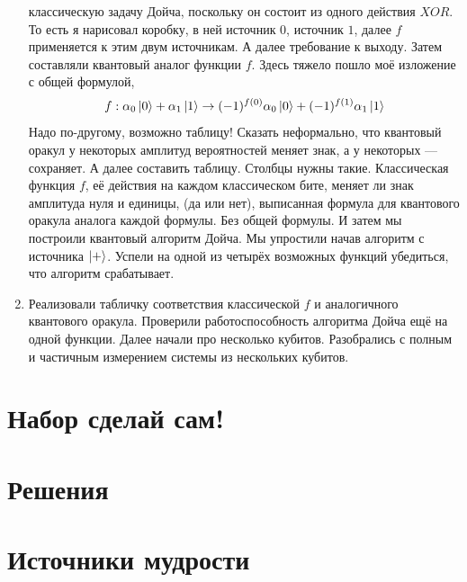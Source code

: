 \documentclass[12pt]{article}
\newcounter{problem}[section]
\theoremstyle{definition}
\begin{document}
\begin{enumerate}
  классическую задачу Дойча, поскольку он состоит из одного действия $XOR$. То есть
  я нарисовал коробку, в ней источник $0$, источник $1$, далее $f$ применяется к
  этим двум источникам. А далее требование к выходу. Затем составляли квантовый
  аналог функции $f$. Здесь тяжело пошло моё изложение с общей формулой,
  \[
   f : \alpha_0 \ket{0} + \alpha_1 \ket{1} \to
   (-1)^{f(0)}\alpha_0 \ket{0} + (-1)^{f(1)}\alpha_1 \ket{1}
  \]
  Надо по-другому, возможно таблицу! Сказать неформально, что квантовый оракул
  у некоторых амплитуд вероятностей меняет знак, а у некоторых — сохраняет.
  А далее составить таблицу. Столбцы нужны такие. Классическая функция $f$,
  её действия на каждом классическом бите, меняет ли знак амплитуда нуля и единицы,
  (да или нет), выписанная формула для квантового оракула аналога каждой формулы.
  Без общей формулы. И затем мы построили
  квантовый алгоритм Дойча. Мы упростили начав алгоритм с источника $\ket{+}$.
  Успели на одной из четырёх возможных функций убедиться, что алгоритм срабатывает.
  \item Реализовали табличку соответствия классической $f$ и
  аналогичного квантового оракула. Проверили работоспособность алгоритма Дойча
  ещё на одной функции. Далее начали про несколько кубитов. Разобрались с полным
  и частичным измерением системы из нескольких кубитов. 
\end{enumerate}




\renewenvironment{solution}[1]{%
         \vskip .5cm plus 2cm minus 0.1cm%
         {\bfseries \hyperlink{problem:#1}{#1.}}%
}%
{%
}%

\section{Набор сделай сам!}

\cite{stay2014deutch}

\section{Решения}



\section{Источники мудрости}
\printbibliography[heading=none]
\end{document}
